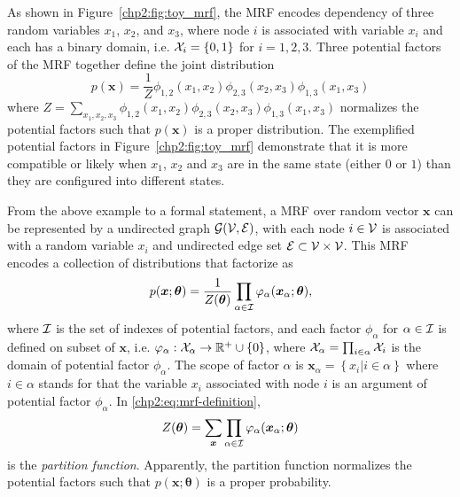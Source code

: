\begin{example}\label{chpt2:mrf-3node-example}
  As shown in Figure~\ref{chp2:fig:toy_mrf}, the MRF encodes dependency of three random variables $x_1$, $x_2$, and $x_3$, where node $i$ is associated with variable $x_i$ and each has a binary domain, i.e. $\mathcal{X}_i = \{0,1\}$ for $i =1,2,3$. Three potential factors of the MRF together define the joint distribution
  \begin{equation*}
    p(\bm{x}) = \frac{1}{Z} \phi_{1,2}(x_1, x_2) \phi_{2,3}(x_2, x_3) \phi_{1,3}(x_1, x_3)
  \end{equation*}
  where $Z = \sum_{x_1, x_2, x_3}\phi_{1,2}(x_1, x_2) \phi_{2,3}(x_2, x_3) \phi_{1,3}(x_1, x_3)$ normalizes the potential factors such that $p(\bm{x})$ is a proper distribution. The exemplified potential factors in Figure~\ref{chp2:fig:toy_mrf} demonstrate that it is more compatible or likely when $x_1$, $x_2$ and $x_3$ are in the same state (either $0$ or $1$) than they are configured into different states.
\end{example}

From the above example to a formal statement, a MRF over random vector $\bm{x}$ can be represented by a undirected graph $\mathcal{G}(\mathcal{V}, \mathcal{E})$, with each node $i \in \mathcal{V}$ is associated with a random variable $x_i$ and undirected edge set $\mathcal{E} \subset \mathcal{V} \times \mathcal{V}$. This MRF encodes a collection of distributions that factorize as
\begin{equation}\label{chp2:eq:mrf-definition}
  p(\bm{x};\bm{\theta}) = \frac{1}{Z(\bm{\theta})} \prod_{\alpha \in \mathcal{I}} \varphi_{\alpha}(\bm{x}_{\alpha};\bm{\theta}),
\end{equation}
where $\mathcal{I}$ is the set of indexes of potential factors, and each factor $\phi_{\alpha}$ for $\alpha\in \mathcal{I}$ is defined on subset of $\bm{x}$, i.e. $\varphi_{\alpha}: \mathcal{X}_{\alpha} \rightarrow \mathbb{R}^{+} \cup \{0\}$, where $\mathcal{X}_{\alpha} = \prod_{i\in \alpha}\mathcal{X}_i$ is the domain of potential factor $\phi_{\alpha}$. The scope of factor $\alpha$ is $\bm{x}_{\alpha} = \left\{ x_i| i\in \alpha \right\}$ where $i \in \alpha$ stands for that the variable $x_i$ associated with node $i$ is an argument of potential factor $\phi_{\alpha}$. In \eqref{chp2:eq:mrf-definition},
\begin{equation}
  Z(\bm{\theta}) = \sum_{\bm{x}} \prod_{\alpha \in \mathcal{I}} \varphi_{\alpha}(\bm{x}_{\alpha};\bm{\theta})
\end{equation}
is the \textit{partition function}. Apparently, the partition function normalizes the potential factors such that $p(\bm{x}; \bm{\theta})$ is a proper probability.

